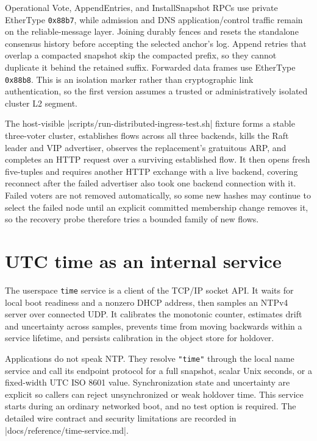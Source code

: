 Operational Vote, AppendEntries, and InstallSnapshot RPCs use private
EtherType \texttt{0x88b7}, while admission and DNS application/control traffic
remain on the reliable-message layer. Joining durably fences and resets the
standalone consensus history before accepting the selected anchor's log.
Append retries that overlap a compacted snapshot skip the compacted prefix, so
they cannot duplicate it behind the retained suffix. Forwarded data frames use
EtherType \texttt{0x88b8}. This is an isolation marker rather than
cryptographic link authentication, so the first version assumes a trusted or
administratively isolated cluster L2 segment.

The host-visible \repofile|scripts/run-distributed-ingress-test.sh| fixture
forms a stable three-voter cluster, establishes flows across all three
backends, kills the Raft leader and VIP advertiser, observes the replacement's
gratuitous ARP, and completes an HTTP request over a surviving established
flow. It then opens fresh five-tuples and requires another HTTP exchange with a
live backend, covering reconnect after the failed advertiser also took one
backend connection with it. Failed voters are not removed automatically, so
some new hashes may continue to select the failed node until an explicit
committed membership change removes it, so the recovery probe therefore tries a
bounded family of new flows.

\section{UTC time as an internal service}

The userspace \texttt{time} service is a client of the TCP/IP socket API. It
waits for local boot readiness and a nonzero DHCP address, then samples an NTPv4
server over connected UDP. It calibrates the monotonic counter, estimates drift
and uncertainty across samples, prevents time from moving backwards within a
service lifetime, and persists calibration in the object store for holdover.

Applications do not speak NTP. They resolve \texttt{"time"} through the local
name service and call its endpoint protocol for a full snapshot, scalar Unix
seconds, or a fixed-width UTC ISO 8601 value. Synchronization state and
uncertainty are explicit so callers can reject unsynchronized or weak holdover
time. This service starts during an ordinary networked boot, and no test option is
required. The detailed wire contract and security limitations are recorded in
\repofile|docs/reference/time-service.md|.

